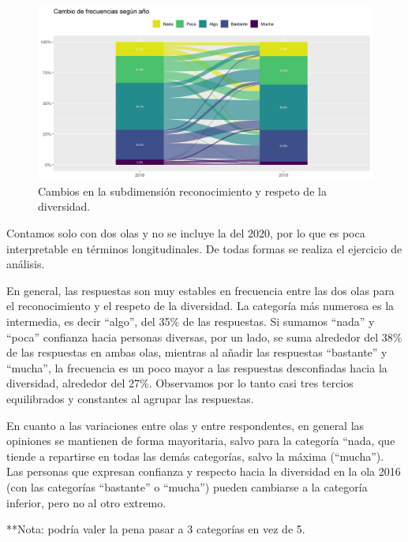 \documentclass[
  12pt,
]{book}
\begin{document}
\begin{figure}[H]

{\centering \includegraphics[width=1\linewidth,height=1\textheight]{output/graphs/alluvial_diversidad} 

}

\caption{Cambios en la subdimensión reconocimiento y respeto de la diversidad.}\label{fig:alluvial-diversidad}
\end{figure}

Contamos solo con dos olas y no se incluye la del 2020, por lo que es poca interpretable en términos longitudinales. De todas formas se realiza el ejercicio de análisis.

En general, las respuestas son muy estables en frecuencia entre las dos olas para el reconocimiento y el respeto de la diversidad. La categoría más numerosa es la intermedia, es decir ``algo'', del 35\% de las respuestas. Si sumamos ``nada'' y ``poca'' confianza hacia personas diversas, por un lado, se suma alrededor del 38\% de las respuestas en ambas olas, mientras al añadir las respuestas ``bastante'' y ``mucha'', la frecuencia es un poco mayor a las respuestas desconfiadas hacia la diversidad, alrededor del 27\%. Observamos por lo tanto casi tres tercios equilibrados y constantes al agrupar las respuestas.

En cuanto a las variaciones entre olas y entre respondentes, en general las opiniones se mantienen de forma mayoritaria, salvo para la categoría ``nada, que tiende a repartirse en todas las demás categorías, salvo la máxima (``mucha''). Las personas que expresan confianza y respecto hacia la diversidad en la ola 2016 (con las categorías ``bastante'' o ``mucha'') pueden cambiarse a la categoría inferior, pero no al otro extremo.

**Nota: podría valer la pena pasar a 3 categorías en vez de 5.
\end{document}
